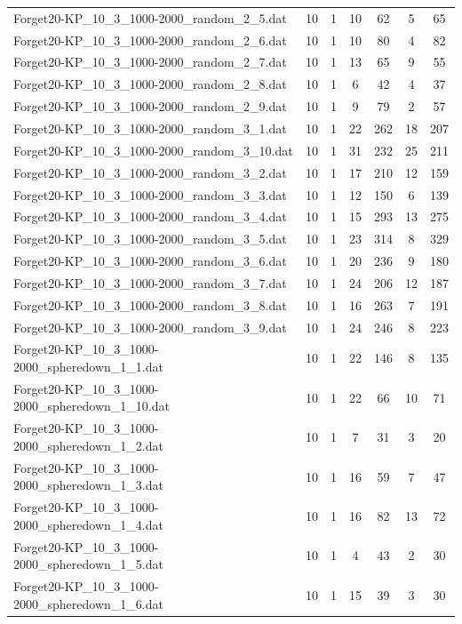 \begin{table}[!ht]
\begin{tabular}{lcccccc}
Forget20-KP\_10\_3\_1000-2000\_random\_2\_5.dat & 10 & 1 & 10 & 62 & 5 & 65 \\
Forget20-KP\_10\_3\_1000-2000\_random\_2\_6.dat & 10 & 1 & 10 & 80 & 4 & 82 \\
Forget20-KP\_10\_3\_1000-2000\_random\_2\_7.dat & 10 & 1 & 13 & 65 & 9 & 55 \\
Forget20-KP\_10\_3\_1000-2000\_random\_2\_8.dat & 10 & 1 & 6 & 42 & 4 & 37 \\
Forget20-KP\_10\_3\_1000-2000\_random\_2\_9.dat & 10 & 1 & 9 & 79 & 2 & 57 \\
Forget20-KP\_10\_3\_1000-2000\_random\_3\_1.dat & 10 & 1 & 22 & 262 & 18 & 207 \\
Forget20-KP\_10\_3\_1000-2000\_random\_3\_10.dat & 10 & 1 & 31 & 232 & 25 & 211 \\
Forget20-KP\_10\_3\_1000-2000\_random\_3\_2.dat & 10 & 1 & 17 & 210 & 12 & 159 \\
Forget20-KP\_10\_3\_1000-2000\_random\_3\_3.dat & 10 & 1 & 12 & 150 & 6 & 139 \\
Forget20-KP\_10\_3\_1000-2000\_random\_3\_4.dat & 10 & 1 & 15 & 293 & 13 & 275 \\
Forget20-KP\_10\_3\_1000-2000\_random\_3\_5.dat & 10 & 1 & 23 & 314 & 8 & 329 \\
Forget20-KP\_10\_3\_1000-2000\_random\_3\_6.dat & 10 & 1 & 20 & 236 & 9 & 180 \\
Forget20-KP\_10\_3\_1000-2000\_random\_3\_7.dat & 10 & 1 & 24 & 206 & 12 & 187 \\
Forget20-KP\_10\_3\_1000-2000\_random\_3\_8.dat & 10 & 1 & 16 & 263 & 7 & 191 \\
Forget20-KP\_10\_3\_1000-2000\_random\_3\_9.dat & 10 & 1 & 24 & 246 & 8 & 223 \\
Forget20-KP\_10\_3\_1000-2000\_spheredown\_1\_1.dat & 10 & 1 & 22 & 146 & 8 & 135 \\
Forget20-KP\_10\_3\_1000-2000\_spheredown\_1\_10.dat & 10 & 1 & 22 & 66 & 10 & 71 \\
Forget20-KP\_10\_3\_1000-2000\_spheredown\_1\_2.dat & 10 & 1 & 7 & 31 & 3 & 20 \\
Forget20-KP\_10\_3\_1000-2000\_spheredown\_1\_3.dat & 10 & 1 & 16 & 59 & 7 & 47 \\
Forget20-KP\_10\_3\_1000-2000\_spheredown\_1\_4.dat & 10 & 1 & 16 & 82 & 13 & 72 \\
Forget20-KP\_10\_3\_1000-2000\_spheredown\_1\_5.dat & 10 & 1 & 4 & 43 & 2 & 30 \\
Forget20-KP\_10\_3\_1000-2000\_spheredown\_1\_6.dat & 10 & 1 & 15 & 39 & 3 & 30 \\

\end{tabular}
\end{table}
